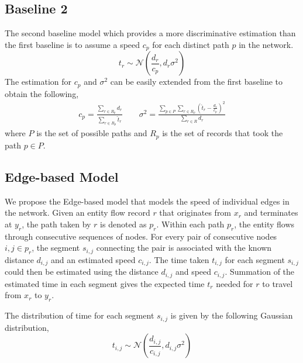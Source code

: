 \documentclass[conference]{IEEEtran.1.8}
\begin{document}
\subsection{Baseline 2}

The second baseline model which provides a more discriminative estimation than the first baseline is to assume a speed $c_p$ for each distinct path $p$ in the network.
\[ t_r \sim \mathcal{N} \left( \frac{d_r}{c_p}, d_r \sigma^2 \right) \]
The estimation for $c_p$ and $\sigma^2$ can be easily extended from the first baseline to obtain the following,
\begin{gather*}
	c_p = \frac{\sum_{r \in R_p} d_r}{\sum_{r \in R_p} \hat{t}_r} \qquad
    \sigma^2 = \frac{ \sum_{p \in P} \sum_{r \in R_p} \left( \hat{t}_r - \frac{d_r}{c_p} \right)^2 }{ \sum_{r \in R} d_r }
\end{gather*}
where $P$ is the set of possible paths and $R_p$ is the set of records that took the path $p \in P$.

\subsection{Edge-based Model}

We propose the Edge-based model that models the speed of individual edges in the network. Given an entity flow record $r$ that originates from $x_r$ and terminates at $y_r$, the path taken by $r$ is denoted as $p_r$. Within each path $p_r$, the entity flows through consecutive sequences of nodes. For every pair of consecutive nodes $i,j \in p_r$, the segment $s_{i,j}$ connecting the pair is associated with the known distance $d_{i,j}$ and an estimated speed $c_{i,j}$. The time taken $t_{i,j}$ for each segment $s_{i,j}$ could then be estimated using the distance $d_{i,j}$ and speed $c_{i,j}$. Summation of the estimated time in each segment gives the expected time $t_r$ needed for $r$ to travel from $x_r$ to $y_r$.

The distribution of time for each segment $s_{i,j}$ is given by the following Gaussian distribution,
\[ t_{i,j} \sim \mathcal{N} \left( \frac{d_{i,j}}{c_{i,j}}, d_{i,j} \sigma^2 \right) \]
\end{document}
